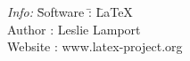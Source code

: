 \documentclass{article}
\begin{document}
\begin{tabbing}
\emph{Info:} \= Software \= : \= \LaTeX \\
  \> Author \> : \> Leslie Lamport \\
  \> Website \> : \> www.latex-project.org
\end{tabbing}
\end{document}
